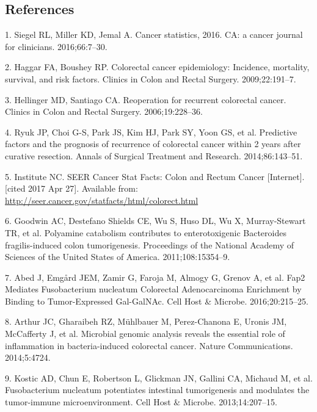 \documentclass[12pt,]{article}
\begin{document}
\subsection{References}\label{references}

\hypertarget{refs}{}
\hypertarget{ref-siegel_cancer_2016}{}
1. Siegel RL, Miller KD, Jemal A. Cancer statistics, 2016. CA: a cancer
journal for clinicians. 2016;66:7--30.

\hypertarget{ref-haggar_colorectal_2009}{}
2. Haggar FA, Boushey RP. Colorectal cancer epidemiology: Incidence,
mortality, survival, and risk factors. Clinics in Colon and Rectal
Surgery. 2009;22:191--7.

\hypertarget{ref-hellinger_reoperation_2006}{}
3. Hellinger MD, Santiago CA. Reoperation for recurrent colorectal
cancer. Clinics in Colon and Rectal Surgery. 2006;19:228--36.

\hypertarget{ref-ryuk_predictive_2014}{}
4. Ryuk JP, Choi G-S, Park JS, Kim HJ, Park SY, Yoon GS, et al.
Predictive factors and the prognosis of recurrence of colorectal cancer
within 2 years after curative resection. Annals of Surgical Treatment
and Research. 2014;86:143--51.

\hypertarget{ref-national_cancer_institute_seer_nodate}{}
5. Institute NC. SEER Cancer Stat Facts: Colon and Rectum Cancer
{[}Internet{]}. {[}cited 2017 Apr 27{]}. Available from:
\url{http://seer.cancer.gov/statfacts/html/colorect.html}

\hypertarget{ref-goodwin_polyamine_2011}{}
6. Goodwin AC, Destefano Shields CE, Wu S, Huso DL, Wu X, Murray-Stewart
TR, et al. Polyamine catabolism contributes to enterotoxigenic
Bacteroides fragilis-induced colon tumorigenesis. Proceedings of the
National Academy of Sciences of the United States of America.
2011;108:15354--9.

\hypertarget{ref-abed_fap2_2016}{}
7. Abed J, Emgård JEM, Zamir G, Faroja M, Almogy G, Grenov A, et al.
Fap2 Mediates Fusobacterium nucleatum Colorectal Adenocarcinoma
Enrichment by Binding to Tumor-Expressed Gal-GalNAc. Cell Host \&
Microbe. 2016;20:215--25.

\hypertarget{ref-arthur_microbial_2014}{}
8. Arthur JC, Gharaibeh RZ, Mühlbauer M, Perez-Chanona E, Uronis JM,
McCafferty J, et al. Microbial genomic analysis reveals the essential
role of inflammation in bacteria-induced colorectal cancer. Nature
Communications. 2014;5:4724.

\hypertarget{ref-kostic_fusobacterium_2013}{}
9. Kostic AD, Chun E, Robertson L, Glickman JN, Gallini CA, Michaud M,
et al. Fusobacterium nucleatum potentiates intestinal tumorigenesis and
modulates the tumor-immune microenvironment. Cell Host \& Microbe.
2013;14:207--15.
\end{document}
